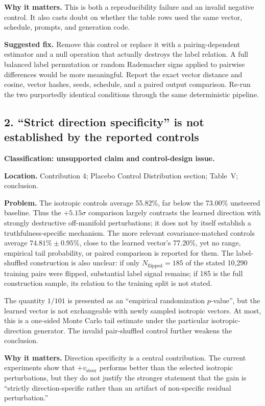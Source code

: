 \documentclass[11pt]{article}
\begin{document}
\textbf{Why it matters.} This is both a reproducibility failure and an invalid negative control.  It also casts doubt on whether the table rows used the same vector, schedule, prompts, and generation code.

\textbf{Suggested fix.} Remove this control or replace it with a pairing-dependent estimator and a null operation that actually destroys the label relation.  A full balanced label permutation or random Rademacher signs applied to pairwise differences would be more meaningful.  Report the exact vector distance and cosine, vector hashes, seeds, schedule, and a paired output comparison.  Re-run the two purportedly identical conditions through the same deterministic pipeline.

\subsection*{2. ``Strict direction specificity'' is not established by the reported controls}

\textbf{Classification: unsupported claim and control-design issue.}

\textbf{Location.} Contribution 4; Placebo Control Distribution section; Table~V; conclusion.

\textbf{Problem.} The isotropic controls average 55.82\%, far below the 73.00\% unsteered baseline.  Thus the $+5.15\sigma$ comparison largely contrasts the learned direction with strongly destructive off-manifold perturbations; it does not by itself establish a truthfulness-specific mechanism.  The more relevant covariance-matched controls average $74.81\%\pm0.95\%$, close to the learned vector's 77.20\%, yet no range, empirical tail probability, or paired comparison is reported for them.  The label-shuffled construction is also unclear: if only $N_{\text{flipped}}=185$ of the stated 10,290 training pairs were flipped, substantial label signal remains; if 185 is the full construction sample, its relation to the training split is not stated.

The quantity $1/101$ is presented as an ``empirical randomization $p$-value'', but the learned vector is not exchangeable with newly sampled isotropic vectors.  At most, this is a one-sided Monte Carlo tail estimate under the particular isotropic-direction generator.  The invalid pair-shuffled control further weakens the conclusion.

\textbf{Why it matters.} Direction specificity is a central contribution.  The current experiments show that $+v_{\text{steer}}$ performs better than the selected isotropic perturbations, but they do not justify the stronger statement that the gain is ``strictly direction-specific rather than an artifact of non-specific residual perturbation.''
\end{document}

